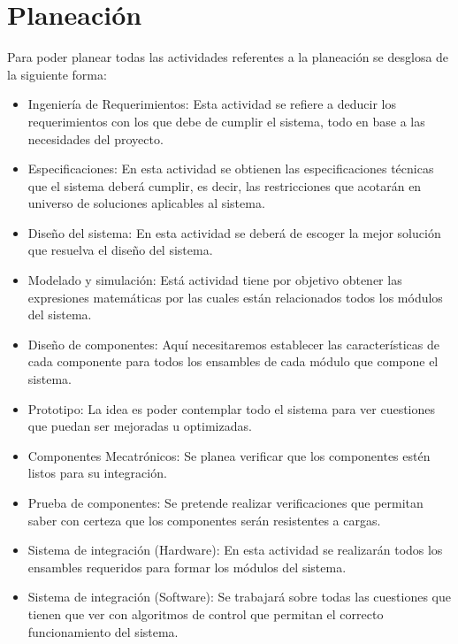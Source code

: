 \section{Planeaci\'on}
% 
Para poder planear todas las actividades referentes a la planeaci\'on se desglosa de la siguiente forma:\newline
\begin{itemize}
	\item Ingenier\'ia de Requerimientos: Esta actividad se refiere a deducir los requerimientos con los que debe de cumplir el sistema, todo en base a las necesidades del proyecto.
	\item Especificaciones: En esta actividad se obtienen las especificaciones t\'ecnicas que el sistema deber\'a cumplir, es decir, las restricciones que acotar\'an en universo de soluciones aplicables al sistema.
	\item Dise\~{n}o del sistema: En esta actividad se deber\'a de escoger la mejor soluci\'on que resuelva el dise\~{n}o del sistema.
	\item Modelado y simulaci\'on: Est\'a actividad tiene por objetivo obtener las expresiones matem\'aticas por las cuales est\'an relacionados todos los m\'odulos del sistema.
	\item Dise\~{n}o de componentes: Aqu\'i necesitaremos establecer las caracter\'isticas de cada componente para todos los ensambles de cada m\'odulo que compone el sistema.
	\newline\newline\newline\newline\newline\newline\newline\newline\newline
	\item Prototipo: La idea es poder contemplar todo el sistema para ver cuestiones que puedan ser mejoradas u optimizadas.
	\item Componentes Mecatr\'onicos: Se planea verificar que los componentes est\'en listos para su integraci\'on.
	\item Prueba de componentes: Se pretende realizar verificaciones que permitan saber con certeza que los componentes ser\'an resistentes a cargas.
	\item Sistema de integraci\'on (Hardware): En esta actividad se realizar\'an todos los ensambles requeridos para formar los m\'odulos del sistema.
	\item Sistema de integraci\'on (Software): Se trabajar\'a  sobre todas las cuestiones que tienen que ver con algoritmos de control que permitan el correcto funcionamiento del sistema.

\end{itemize}
